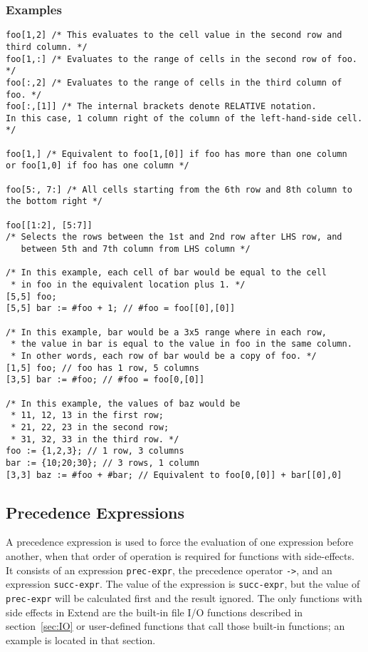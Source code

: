 \subsubsection{Examples}
\begin{lstlisting}
foo[1,2] /* This evaluates to the cell value in the second row and third column. */
foo[1,:] /* Evaluates to the range of cells in the second row of foo. */
foo[:,2] /* Evaluates to the range of cells in the third column of foo. */
foo[:,[1]] /* The internal brackets denote RELATIVE notation.
In this case, 1 column right of the column of the left-hand-side cell. */

foo[1,] /* Equivalent to foo[1,[0]] if foo has more than one column
or foo[1,0] if foo has one column */

foo[5:, 7:] /* All cells starting from the 6th row and 8th column to the bottom right */

foo[[1:2], [5:7]]
/* Selects the rows between the 1st and 2nd row after LHS row, and
   between 5th and 7th column from LHS column */

/* In this example, each cell of bar would be equal to the cell
 * in foo in the equivalent location plus 1. */
[5,5] foo;
[5,5] bar := #foo + 1; // #foo = foo[[0],[0]]

/* In this example, bar would be a 3x5 range where in each row,
 * the value in bar is equal to the value in foo in the same column.
 * In other words, each row of bar would be a copy of foo. */
[1,5] foo; // foo has 1 row, 5 columns
[3,5] bar := #foo; // #foo = foo[0,[0]]

/* In this example, the values of baz would be
 * 11, 12, 13 in the first row;
 * 21, 22, 23 in the second row;
 * 31, 32, 33 in the third row. */
foo := {1,2,3}; // 1 row, 3 columns
bar := {10;20;30}; // 3 rows, 1 column
[3,3] baz := #foo + #bar; // Equivalent to foo[0,[0]] + bar[[0],0]

\end{lstlisting}
\subsection{Precedence Expressions}
A precedence expression is used to force the evaluation of one expression before another, when that order of operation is required for functions with side-effects. It consists of an expression \texttt{prec-expr}, the precedence operator \texttt{->}, and an expression \texttt{succ-expr}. The value of the expression is \texttt{succ-expr}, but the value of \texttt{prec-expr} will be calculated first and the result ignored. The only functions with side effects in Extend are the built-in file I/O functions described in section~\ref{sec:IO} or user-defined functions that call those built-in functions; an example is located in that section.
